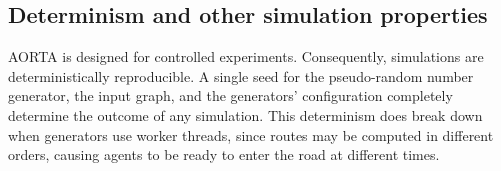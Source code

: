 \documentclass[letterpaper, 10 pt, conference]{ieeeconf}  %
\begin{document}




\subsection{Determinism and other simulation properties}

AORTA is designed for controlled experiments. Consequently, simulations are
deterministically reproducible. A single seed for the pseudo-random number
generator, the input graph, and the generators' configuration completely
determine the outcome of any simulation. This determinism does break down when
generators use worker threads, since routes may be computed in different orders,
causing agents to be ready to enter the road at different times.



 

\end{document}
